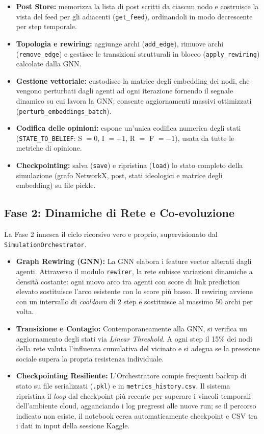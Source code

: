 \documentclass[11pt, a4paper]{article}
\begin{document}
\begin{itemize}[leftmargin=*]
    \item \textbf{Post Store:} memorizza la lista di post scritti da ciascun nodo e costruisce la vista del feed per gli adiacenti (\texttt{get\_feed}), ordinandoli in modo decrescente per step temporale.
    \item \textbf{Topologia e rewiring:} aggiunge archi (\texttt{add\_edge}), rimuove archi (\texttt{remove\_edge}) e gestisce le transizioni strutturali in blocco (\texttt{apply\_rewiring}) calcolate dalla GNN.
    \item \textbf{Gestione vettoriale:} custodisce la matrice degli embedding dei nodi, che vengono perturbati dagli agenti ad ogni iterazione fornendo il segnale dinamico su cui lavora la GNN; consente aggiornamenti massivi ottimizzati (\texttt{perturb\_embeddings\_batch}).
    \item \textbf{Codifica delle opinioni:} espone un'unica codifica numerica degli stati (\texttt{STATE\_TO\_BELIEF}: S $= 0$, I $= +1$, R $=$ F $= -1$), usata da tutte le metriche di opinione.
    \item \textbf{Checkpointing:} salva (\texttt{save}) e ripristina (\texttt{load}) lo stato completo della simulazione (grafo NetworkX, post, stati ideologici e matrice degli embedding) su file pickle.
\end{itemize}

\subsection{Fase 2: Dinamiche di Rete e Co-evoluzione}
La Fase 2 innesca il ciclo ricorsivo vero e proprio, supervisionato dal \texttt{SimulationOrchestrator}.
\begin{itemize}[leftmargin=*]
    \item \textbf{Graph Rewiring (GNN):} La GNN elabora i feature vector alterati dagli agenti. Attraverso il modulo \texttt{rewirer}, la rete subisce variazioni dinamiche a densità costante: ogni nuovo arco tra agenti con score di link prediction elevato sostituisce l'arco esistente con lo score più basso. Il rewiring avviene con un intervallo di \textit{cooldown} di 2 step e sostituisce al massimo 50 archi per volta.
    \item \textbf{Transizione e Contagio:} Contemporaneamente alla GNN, si verifica un aggiornamento degli stati via \textit{Linear Threshold}. A ogni step il 15\% dei nodi della rete valuta l'influenza cumulativa del vicinato e si adegua se la pressione sociale supera la propria resistenza individuale.
    \item \textbf{Checkpointing Resiliente:} L'Orchestratore compie frequenti backup di stato su file serializzati (\texttt{.pkl}) e in \texttt{metrics\_history.csv}. Il sistema ripristina il \textit{loop} dal checkpoint più recente per superare i vincoli temporali dell'ambiente cloud, agganciando i log pregressi alle nuove run; se il percorso indicato non esiste, il notebook cerca automaticamente checkpoint e CSV tra i dati in input della sessione Kaggle.
\end{itemize}
\end{document}
